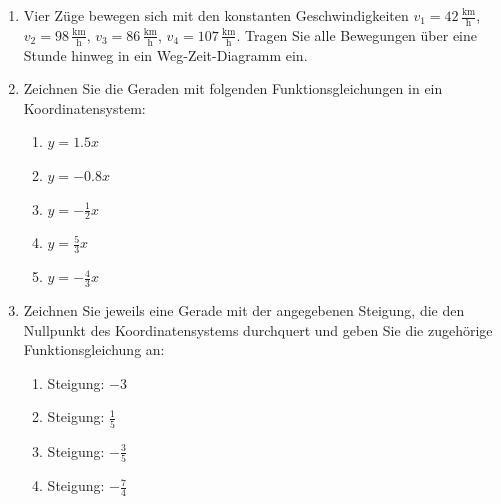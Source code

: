 \documentclass[%
11pt,%
twoside,%
titlepage,%
german,%
headsepline%
]{scrartcl}
\newcommand{\ufrac}[2]{\ensuremath{\,\frac{\mathrm{#1}}{\mathrm{#2}}}}
\begin{document}
{{\begin{enumerate}
\item Vier Z\"uge bewegen sich mit den konstanten Geschwindigkeiten $v_1=42\ufrac{km}{h}$, $v_2=98\ufrac{km}{h}$, $v_3=86\ufrac{km}{h}$, $v_4=107\ufrac{km}{h}$. Tragen Sie alle Bewegungen \"uber eine Stunde hinweg in ein Weg-Zeit-Diagramm ein.

\item Zeichnen Sie die Geraden mit folgenden Funktionsgleichungen in ein Koordinatensystem:
  \begin{enumerate}
  \item $y=1.5x$
  \item $y=-0.8x$
  \item $y=-\frac{1}{2}x$
  \item $y=\frac{5}{3}x$
  \item $y=-\frac{4}{3}x$
  \end{enumerate}

\item Zeichnen Sie jeweils eine Gerade mit der angegebenen Steigung, die den Nullpunkt des Koordinatensystems durchquert und geben Sie die zugeh\"orige Funktionsgleichung an:
  \begin{enumerate}
  \item Steigung: $\displaystyle -3$
  \item Steigung: $\displaystyle \frac{1}{5}$
  \item Steigung: $\displaystyle -\frac{3}{5}$
  \item Steigung: $\displaystyle -\frac{7}{4}$
  \end{enumerate}



\end{enumerate}}}
\end{document}
